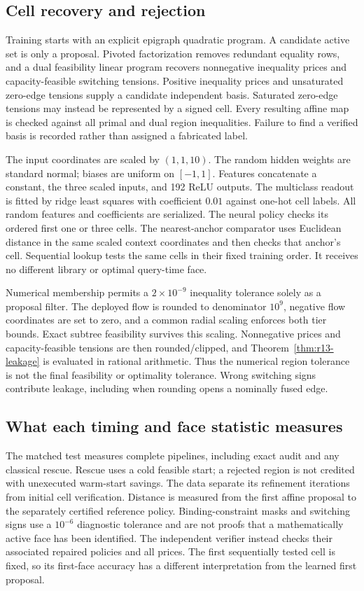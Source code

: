 \documentclass[11pt,letterpaper]{article}
\theoremstyle{definition}
\newcommand{\1}{\mathbf 1}
\begin{document}
\subsection{Cell recovery and rejection}
Training starts with an explicit epigraph quadratic program. A candidate active set is only a proposal. Pivoted factorization removes redundant equality rows, and a dual feasibility linear program recovers nonnegative inequality prices and capacity-feasible switching tensions. Positive inequality prices and unsaturated zero-edge tensions supply a candidate independent basis. Saturated zero-edge tensions may instead be represented by a signed cell. Every resulting affine map is checked against all primal and dual region inequalities. Failure to find a verified basis is recorded rather than assigned a fabricated label.

The input coordinates are scaled by $(1,1,10)$. The random hidden weights are standard normal; biases are uniform on $[-1,1]$. Features concatenate a constant, the three scaled inputs, and 192 ReLU outputs. The multiclass readout is fitted by ridge least squares with coefficient $0.01$ against one-hot cell labels. All random features and coefficients are serialized. The neural policy checks its ordered first one or three cells. The nearest-anchor comparator uses Euclidean distance in the same scaled context coordinates and then checks that anchor's cell. Sequential lookup tests the same cells in their fixed training order. It receives no different library or optimal query-time face.

Numerical membership permits a $2\times10^{-9}$ inequality tolerance solely as a proposal filter. The deployed flow is rounded to denominator $10^9$, negative flow coordinates are set to zero, and a common radial scaling enforces both tier bounds. Exact subtree feasibility survives this scaling. Nonnegative prices and capacity-feasible tensions are then rounded/clipped, and Theorem~\ref{thm:r13-leakage} is evaluated in rational arithmetic. Thus the numerical region tolerance is not the final feasibility or optimality tolerance. Wrong switching signs contribute leakage, including when rounding opens a nominally fused edge.

\subsection{What each timing and face statistic measures}
The matched test measures complete pipelines, including exact audit and any classical rescue. Rescue uses a cold feasible start; a rejected region is not credited with unexecuted warm-start savings. The data separate its refinement iterations from initial cell verification. Distance is measured from the first affine proposal to the separately certified reference policy. Binding-constraint masks and switching signs use a $10^{-6}$ diagnostic tolerance and are not proofs that a mathematically active face has been identified. The independent verifier instead checks their associated repaired policies and all prices. The first sequentially tested cell is fixed, so its first-face accuracy has a different interpretation from the learned first proposal.
\end{document}

